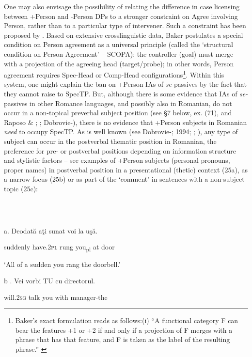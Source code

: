 \documentclass[output=paper]{langsci/langscibook}
\begin{document}
  One may also envisage the possibility of relating the difference in case licensing between +Person and -Person DPs to a stronger constraint on Agree involving Person, rather than to a particular type of intervener. Such a constraint has been proposed by \citet{Baker2008}. Based on extensive crosslinguistic data, Baker postulates a special condition on Person agreement as a universal principle (called the ‘structural condition on Person Agreement’ – SCOPA): the controller (goal) must merge with a projection of the agreeing head (target/probe); in other words, Person agreement requires Spec-Head or Comp-Head configurations\footnote{Baker’s exact formulation reads as follows:(i)  “A functional category F can bear the features +1 or +2 if and only if a projection of F merges with a phrase that has that feature, and F is taken as the label of the resulting phrase.” \citep[52]{Baker2008}}. Within this system, one might explain the ban on +Person IAs of \textit{se-}passives by the fact that they cannot raise to SpecTP. But, although there is some evidence that IAs of \textit{se-}passives in other Romance languages, and possibly also in Romanian, do not occur in a non-topical preverbal subject position (see §7 below, ex. (71), and Raposo \& \citealt{Uriagereka1996}; \citealt{Cornilescu1998}; Dobrovie-\citealt{Sorin2006}), there is no evidence that +Person subjects in Romanian \textit{need} to occupy SpecTP. As is well known (see Dobrovie-\citealt{Sorin1987}; 1994; \citealt{Cornilescu1997}; \citealt{Alboiu2002}), any type of subject can occur in the postverbal thematic position in Romanian, the preference for pre- or postverbal positions depending on information structure and stylistic factors – see examples of +Person subjects (personal pronouns, proper names) in postverbal position in a presentational (thetic) context (25a), as a narrow focus (25b) or as part of the ‘comment’ in sentences with a non-subject topic (25c):

\ea%
    \label{ex:key:25}
    \gll\\
        \\
    \glt
    \z

          a.   Deodată   aţi           sunat   voi     la  uşă.  

      suddenly have.2\textsc{pl}  rung   you\textsubscript{pl}   at door

     ‘All of a sudden you rang the doorbell.’

b .   Vei        vorbi TU  cu    directorul.         

       will.2\textsc{sg} talk    you with manager-the
\end{document}
